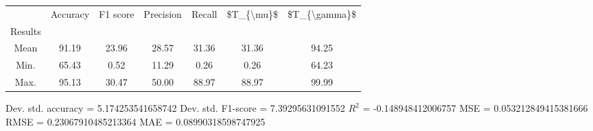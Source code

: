 \begin{tabular}{|c|c|c|c|c|c|c|}
\toprule
{} &  Accuracy &  F1 score &  Precision &  Recall &  \$T\_\{\textbackslash mu\}\$ &  \$T\_\{\textbackslash gamma\}\$ \\
Results &           &           &            &         &            &               \\
\hline
Mean    &     91.19 &     23.96 &      28.57 &   31.36 &      31.36 &         94.25 \\
Min.    &     65.43 &      0.52 &      11.29 &    0.26 &       0.26 &         64.23 \\
Max.    &     95.13 &     30.47 &      50.00 &   88.97 &      88.97 &         99.99 \\
\bottomrule
\end{tabular}

 Dev. std. accuracy = 5.174253541658742
 Dev. std. F1-score = 7.39295631091552
 $R^2$ = -0.148948412006757
 MSE = 0.053212849415381666
 RMSE = 0.23067910485213364
 MAE = 0.08990318598747925